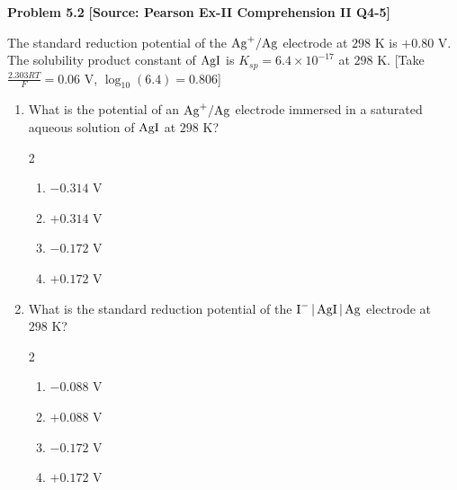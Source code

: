 \begin{problembox}
\textbf{Problem 5.2} \hfill \textbf{[Source: Pearson Ex-II Comprehension II Q4-5]}

The standard reduction potential of the $\ce{Ag+/Ag}$ electrode at $298\text{ K}$ is $+0.80\text{ V}$. The solubility product constant of $\ce{AgI}$ is $K_{sp} = 6.4 \times 10^{-17}$ at $298\text{ K}$. [Take $\frac{2.303 RT}{F} = 0.06\text{ V}$, $\log_{10}(6.4) = 0.806$]

\begin{enumerate}[label=\textbf{Part \arabic*:}]
    \item What is the potential of an $\ce{Ag+/Ag}$ electrode immersed in a saturated aqueous solution of $\ce{AgI}$ at $298\text{ K}$?
    \begin{multicols}{2}
    \begin{enumerate}[label=(\alph*)]
        \item $-0.314\text{ V}$
        \item $+0.314\text{ V}$
        \item $-0.172\text{ V}$
        \item $+0.172\text{ V}$
    \end{enumerate}
    \end{multicols}
    
    \item What is the standard reduction potential of the $\ce{I- | AgI | Ag}$ electrode at $298\text{ K}$?
    \begin{multicols}{2}
    \begin{enumerate}[label=(\alph*)]
        \item $-0.088\text{ V}$
        \item $+0.088\text{ V}$
        \item $-0.172\text{ V}$
        \item $+0.172\text{ V}$
    \end{enumerate}
    \end{multicols}
\end{enumerate}
\end{problembox}
